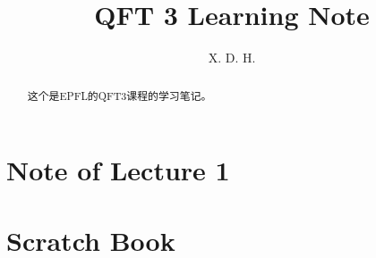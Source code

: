 \documentclass[12pt]{report}
\begin{document}
\title{\boldmath QFT 3 Learning Note}
\author{X. D. H.}

\maketitle

\begin{abstract}
  这个是EPFL的QFT3课程的学习笔记。
\end{abstract}

\tableofcontents

\chapter{Note of Lecture 1}\label{chap:Lecture 1} %


\chapter{Scratch Book}

\end{document}
